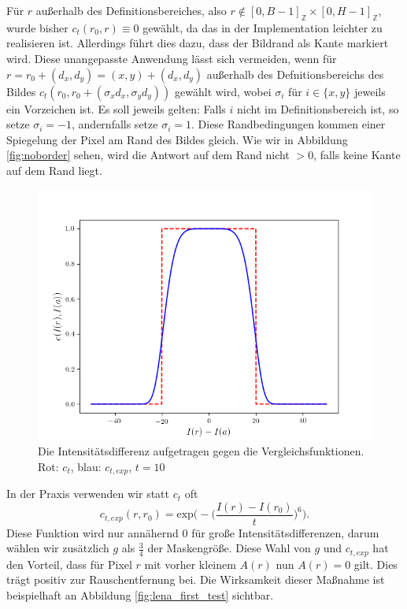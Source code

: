 \documentclass[a4paper, 11pt]{report}
\theoremstyle{definition}
\begin{document}
			Für $r$ außerhalb des Definitionsbereiches, also $r \notin [0, B-1]_\mathbb{Z} \times [0, H-1]_\mathbb{Z}$, wurde bisher $c_t(r_0,r) \equiv 0$ gewählt, da das in der Implementation leichter zu realisieren ist. Allerdings führt dies dazu, dass der Bildrand als Kante markiert wird. Diese unangepasste Anwendung lässt sich vermeiden, wenn für $r = r_0 + (d_x, d_y) = (x, y) + (d_x, d_y)$ außerhalb des Defnitionsbereichs des Bildes $c_t(r_0, r_0 + (\sigma_x d_x, \sigma_y d_y))$ gewählt wird, wobei $\sigma_i$ für $i \in \{x,y\}$ jeweils ein Vorzeichen ist.
			Es soll jeweils gelten: Falls $i$ nicht im Definitionsbereich ist, so setze $\sigma_i = -1$, andernfalls setze $\sigma_i = 1$.
			Diese Randbedingungen kommen einer Spiegelung der Pixel am Rand des Bildes gleich. Wie wir in Abbildung \ref{fig:noborder} sehen, wird die Antwort auf dem Rand nicht $> 0$, falls keine Kante auf dem Rand liegt.

			\begin{figure}[H]\centering
				\includegraphics[width=.6\textwidth]{./py/cexp.png}
				\caption{Die Intensitätsdifferenz aufgetragen gegen die Vergleichsfunktionen. Rot: $c_t$, blau: $c_{t,exp}$, $t = 10$}
			\end{figure}

			In der Praxis verwenden wir statt $c_t$ oft
			$$
				c_{t, exp}(r, r_0) =
					\text{exp}\bigg(-\Big(\frac{I(r) - I(r_0)}{t}\Big)^6\bigg).
			$$
			Diese Funktion wird nur annähernd $0$ für große Intensitätsdifferenzen, darum wählen wir zusätzlich $g$ als $\frac{3}{4}$ der Maskengröße. Diese Wahl von $g$ und $c_{t,exp}$ hat den Vorteil, dass für Pixel $r$ mit vorher kleinem $A(r)$ nun $A(r) = 0$ gilt. Dies trägt positiv zur Rauschentfernung bei. Die Wirksamkeit dieser Maßnahme ist beispielhaft an Abbildung \ref{fig:lena_first_test} sichtbar.
\end{document}

